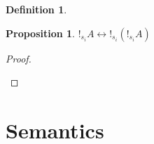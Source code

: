 \documentclass[a4paper]{article}
\newtheorem{prop}{Proposition}
\newtheorem{defin}{Definition}
\begin{document}
\begin{defin}
\begin{prooftree}
\end{prooftree}

    \begin{prooftree}
    \end{prooftree}

    \begin{prooftree}
    \end{prooftree}

    \begin{prooftree}
    \end{prooftree}

    \begin{prooftree}
    \end{prooftree}
\end{defin}

\begin{prop}

$!_{s_i} A \leftrightarrow !_{s_i} (!_{s_i} A)$

\end{prop}

\begin{proof}
$ $

\begin{prooftree}
\end{prooftree}

\end{proof}

\section{Semantics}
\end{document}
